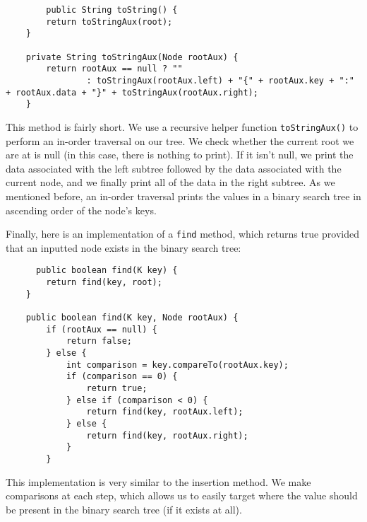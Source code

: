 \begin{lstlisting}
    	public String toString() {
		return toStringAux(root);
	}

	private String toStringAux(Node rootAux) {
		return rootAux == null ? ""
				: toStringAux(rootAux.left) + "{" + rootAux.key + ":" + rootAux.data + "}" + toStringAux(rootAux.right);
	}
\end{lstlisting}

This method is fairly short. We use a recursive helper function \verb!toStringAux()! to perform an in-order traversal on our tree. We check whether the current root we are at is null (in this case, there is nothing to print). If it isn't null, we print the data associated with the left subtree followed by the data associated with the current node, and we finally print all of the data in the right subtree. As we mentioned before, an in-order traversal prints the values in a binary search tree in ascending order of the node's keys.

Finally, here is an implementation of a \verb!find! method, which returns true provided that an inputted node exists in the binary search tree:

\begin{lstlisting}
      public boolean find(K key) {
		return find(key, root);
	}

	public boolean find(K key, Node rootAux) {
		if (rootAux == null) {
			return false;
		} else {
			int comparison = key.compareTo(rootAux.key);
			if (comparison == 0) {
				return true;
			} else if (comparison < 0) {
				return find(key, rootAux.left);
			} else {
				return find(key, rootAux.right);
			}
		}

\end{lstlisting}

This implementation is very similar to the insertion method. We make comparisons at each step, which allows us to easily target where the value should be present in the binary search tree (if it exists at all). 
